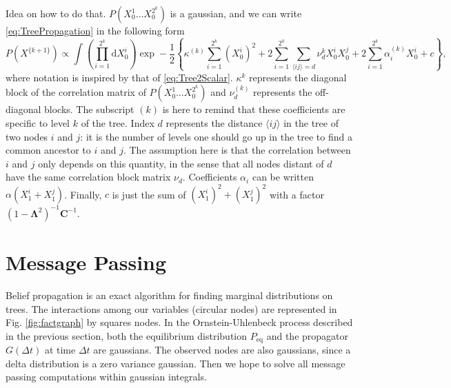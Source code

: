 \documentclass[10pt]{article}
\newcommand{\ddroit}{\textrm{d}}
\newcommand{\Lam}{\bm{\Lambda}}
\newcommand{\Xk}[1]{X^{\{#1\}}}
\begin{document}
Idea on how to do that. $P(X^{1}_0\ldots X^{2^k}_0)$ is a gaussian, and we can write \ref{eq:TreePropagation} in the following form
\begin{equation}
  P(\Xk{k+1}) \propto \int\left(\prod_{i=1}^{2^k}\ddroit X^{i}_0\right) \exp-\frac{1}{2}\left\{\kappa^{(k)}\sum_{i=1}^{2^k}(X^{i}_0)^2 + 2\sum_{i=1}^{2^k}\sum_{\langle ij\rangle=d}\nu_d^{k}X_0^iX_0^j + 2\sum_{i=1}^{2^k}\alpha_i^{(k)}X_0^i +c \right\},
\end{equation}
where notation is inspired by that of \ref{eq:Tree2Scalar}. $\kappa^{k}$ represents the diagonal block of the correlation matrix of $P(X^{1}_0\ldots X^{2^k}_0)$ and $\nu^{(k)}_d$ represents the off-diagonal blocks. The subscript $(k)$ is here to remind that these coefficients are specific to level $k$ of the tree. Index $d$ represents the distance $\langle ij\rangle$ in the tree of two nodes $i$ and $j$: it is the number of levels one should go up in the tree to find a common ancestor to $i$ and $j$. The assumption here is that the correlation between $i$ and $j$ only depends on this quantity, in the sense that all nodes distant of $d$ have the same correlation block matrix $\nu_d$. Coefficients $\alpha_i$ can be written $\alpha (X_1^i + X_1^j)$. Finally, $c$ is just the sum of $(X_1^i)^2 + (X_1^j)^2$ with a factor $(1-\Lam^2)^{-1}\bm{C}^{-1}$.\\






\section{Message Passing}

Belief propagation is an exact algorithm for finding marginal distributions on trees. The interactions among our variables (circular nodes) are represented in Fig. \ref{fig:factgraph} by squares nodes. In the Ornstein-Uhlenbeck process described in the previous section, both the equilibrium distribution $P_{\text{eq}}$ and the propagator $G(\Delta t)$ at time $\Delta t$ are gaussians. The observed nodes are also gaussians, since a delta distribution is a zero variance gaussian. Then we hope to solve all message passing computations within gaussian integrals.
\end{document}
